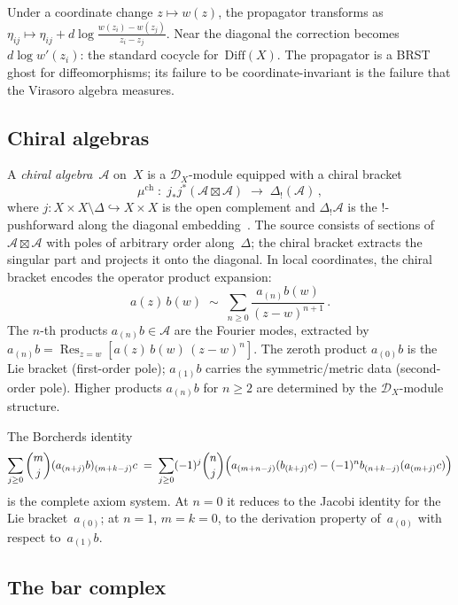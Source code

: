 \documentclass[11pt,reqno]{amsart}
\theoremstyle{definition}
\theoremstyle{remark}
\newcommand{\cA}{\mathcal{A}}
\newcommand{\cD}{\mathcal{D}}
\newcommand{\Res}{\operatorname{Res}}
\newcommand{\Diff}{\mathrm{Diff}}
\numberwithin{equation}{section}
\begin{document}
Under a coordinate change $z \mapsto w(z)$, the propagator
transforms as
$\eta_{ij} \mapsto \eta_{ij}
+ d\log\frac{w(z_i) - w(z_j)}{z_i - z_j}$.
Near the diagonal the correction becomes $d\log w'(z_i)$: the
standard cocycle for~$\Diff(X)$. The propagator is a BRST ghost
for diffeomorphisms; its failure to be coordinate-invariant is
the failure that the Virasoro algebra measures.


\subsection{Chiral algebras}
\label{ssec:chiral}

A \emph{chiral algebra}~$\cA$ on~$X$ is a
$\cD_X$-module equipped with a chiral bracket
\[
\mu^{\mathrm{ch}}
\;\colon\;
j_* j^*(\cA \boxtimes \cA)
\;\longrightarrow\;
\Delta_!(\cA)\,,
\]
where $j \colon X \times X \setminus \Delta
\hookrightarrow X \times X$ is the open complement and
$\Delta_! \cA$ is the $!$-pushforward along the diagonal
embedding~\cite{BD04}. The source consists of sections of
$\cA \boxtimes \cA$ with poles of arbitrary order
along~$\Delta$; the chiral bracket extracts the singular
part and projects it onto the diagonal. In local coordinates,
the chiral bracket encodes the operator product expansion:
\[
a(z)\,b(w)
\;\sim\;
\sum_{n \ge 0}
\frac{a_{(n)}b(w)}{(z - w)^{n+1}}\,.
\]
The $n$-th products $a_{(n)}b \in \cA$ are the Fourier
modes, extracted by
$a_{(n)}b
= \Res_{z=w}[a(z)\,b(w)\,(z{-}w)^n]$.
The zeroth product $a_{(0)}b$ is the Lie bracket
(first-order pole); $a_{(1)}b$ carries the
symmetric/metric data (second-order pole). Higher products
$a_{(n)}b$ for $n \ge 2$ are determined by the
$\cD_X$-module structure.

The Borcherds identity
\begin{equation}\label{eq:borcherds}
\sum_{j \ge 0} \binom{m}{j}
(a_{(n+j)}b)_{(m+k-j)}c
\;=\;
\sum_{j \ge 0} (-1)^j \binom{n}{j}
\Bigl(
a_{(m+n-j)}(b_{(k+j)}c)
- (-1)^n b_{(n+k-j)}(a_{(m+j)}c)
\Bigr)
\end{equation}
is the complete axiom system. At $n = 0$ it reduces to the
Jacobi identity for the Lie bracket~$a_{(0)}$; at $n = 1$,
$m = k = 0$, to the derivation property of~$a_{(0)}$ with
respect to~$a_{(1)}b$.


\subsection{The bar complex}
\label{ssec:bar-complex}
\end{document}
